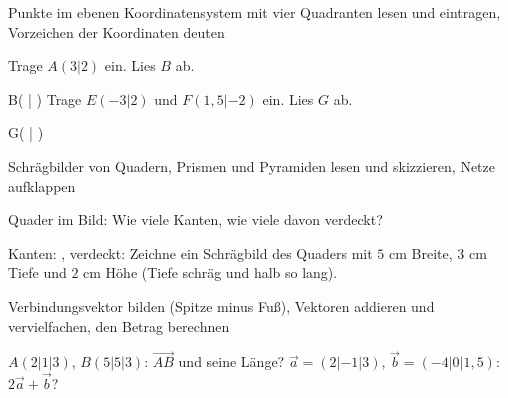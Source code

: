 \setcounter{aufgabe}{0}

\begin{aufgabe}{Punkte im ebenen Koordinatensystem mit vier Quadranten lesen und eintragen, Vorzeichen der Koordinaten deuten}
\begin{teile}
\teil Trage $A(3 | 2)$ ein. Lies $B$ ab.

\begin{ksys}[xmin=-5,xmax=5,ymin=-5,ymax=5]  \end{ksys}
B( \leerfeld | \leerfeld )
\teil Trage $E(-3 | 2)$ und $F(1{,}5 | -2)$ ein. Lies $G$ ab.

\begin{ksys}[xmin=-5,xmax=5,ymin=-5,ymax=5]  \end{ksys}
G( \leerfeld | \leerfeld )
\end{teile}
\end{aufgabe}

\begin{aufgabe}{Schrägbilder von Quadern, Prismen und Pyramiden lesen und skizzieren, Netze aufklappen}
\begin{teile}
\teil Quader im Bild: Wie viele Kanten, wie viele davon verdeckt?

Kanten: \leerfeld , verdeckt: \leerfeld
\teil Zeichne ein Schrägbild des Quaders mit $5$ cm Breite, $3$ cm Tiefe und $2$ cm Höhe (Tiefe schräg und halb so lang).

\begin{ksys}[xmin=0,xmax=8,ymin=0,ymax=5] \end{ksys}
\end{teile}
\end{aufgabe}

\begin{aufgabe}{Verbindungsvektor bilden (Spitze minus Fuß), Vektoren addieren und vervielfachen, den Betrag berechnen}
\begin{teile}
\teil $A(2 | 1 | 3)$, $B(5 | 5 | 3)$: $\overrightarrow{AB}$ und seine Länge?
\teil $\vec a = (2 | -1 | 3)$, $\vec b = (-4 | 0 | 1{,}5)$: $2\vec a + \vec b$?
\end{teile}
\end{aufgabe}

